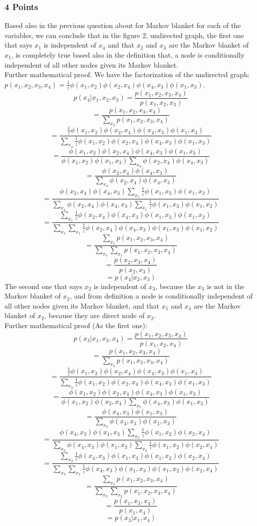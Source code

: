 \subsubsection{4 Points}
Based also in the previous question about for Markov blanket for each of the variables, we can conclude that in the figure 2, undirected graph, the first one that says $x_1$ is independent of $x_4$ and that $x_2$ and $x_3$ are the Markov blanket of $x_1$, is completely true based also in the definition that, a node is conditionally independent of all other nodes given its Markov blanket.\\ 
Further mathematical proof. We have the factorization of the undirected graph: $ p(x_1,x_2,x_3,x_4) = \frac{1}{z}\phi(x_1,x_2)\phi(x_2,x_4)\phi(x_4,x_3)\phi(x_1,x_3)$.
$$ p( x_4 | x_1,x_2,x_3) = \frac{p(x_1,x_2,x_3,x_4)}{p(x_1, x_2,x_3)}$$
$$= \frac{p(x_1,x_2,x_3,x_4)}{\sum_{x_4}p(x_1, x_2,x_3,x_4)}$$
$$= \frac{ \frac{1}{z}\phi(x_1,x_2)\phi(x_2,x_4)\phi(x_4,x_3)\phi(x_1,x_3)}{\sum_{x_4} \frac{1}{z}\phi(x_1,x_2)\phi(x_2,x_4)\phi(x_4,x_3)\phi(x_1,x_3)}$$
$$= \frac{ \phi(x_1,x_2)\phi(x_2,x_4)\phi(x_4,x_3)\phi(x_1,x_3)}{\phi(x_1,x_2)\phi(x_1,x_3) \sum_{x_4} \phi(x_2,x_4)\phi(x_4,x_3)}$$
$$= \frac{ \phi(x_2,x_4)\phi(x_4,x_3)}{\sum_{x_4} \phi(x_2,x_4)\phi(x_4,x_3)}$$
$$= \frac{ \phi(x_2,x_4)\phi(x_4,x_3)\sum_{x_1} \frac{1}{z} \phi(x_1,x_3)\phi(x_1,x_2)}{\sum_{x_4} \phi(x_2,x_4)\phi(x_4,x_3)\sum_{x_1} \frac{1}{z} \phi(x_1,x_3)\phi(x_1,x_2)}$$
$$= \frac{\sum_{x_1} \frac{1}{z} \phi(x_2,x_4)\phi(x_4,x_3) \phi(x_1,x_3)\phi(x_1,x_2)}{\sum_{x_4} \sum_{x_1} \frac{1}{z}\phi(x_2,x_4)\phi(x_4,x_3) \phi(x_1,x_3)\phi(x_1,x_2)}$$
$$= \frac{\sum_{x_1} p(x_1,x_2,x_3,x_4) }{\sum_{x_4} \sum_{x_1} p(x_1,x_2,x_3,x_4) }$$
$$= \frac{p(x_2,x_3,x_4) }{p(x_2,x_3) }$$
$$= p(x_4 |x_2, x_3)$$
 The second one that says $x_2$ is independent of $x_3$, because the $x_3$ is not in the Markov blanket of $x_2$, and from definition a node is conditionally independent of all other nodes given its Markov blanket, and that $x_1$ and $x_4$ are the Markov blanket of $x_2$, because they are direct node of $x_2$.\\
Further mathematical proof (As the first one):\\
 $$ p( x_3 | x_1,x_2,x_4) = \frac{p(x_1,x_2,x_3,x_4)}{p(x_1, x_2,x_4)}$$
$$= \frac{p(x_1,x_2,x_3,x_4)}{\sum_{x_3}p(x_1, x_2,x_3,x_4)}$$
$$= \frac{ \frac{1}{z}\phi(x_1,x_2)\phi(x_2,x_4)\phi(x_4,x_3)\phi(x_1,x_3)}{\sum_{x_3} \frac{1}{z}\phi(x_1,x_2)\phi(x_2,x_4)\phi(x_4,x_3)\phi(x_1,x_3)}$$
$$= \frac{ \phi(x_1,x_2)\phi(x_2,x_4)\phi(x_4,x_3)\phi(x_1,x_3)}{\phi(x_1,x_2)\phi(x_2,x_4) \sum_{x_3} \phi(x_4,x_3)\phi(x_1,x_3)}$$
$$= \frac{\phi(x_4,x_3)\phi(x_1,x_3)}{\sum_{x_3} \phi(x_4,x_3)\phi(x_1,x_3)}$$
$$= \frac{\phi(x_4,x_3)\phi(x_1,x_3)\sum_{x_2} \frac{1}{z} \phi(x_1,x_2)\phi(x_2,x_4)}{\sum_{x_3} \phi(x_4,x_3)\phi(x_1,x_3)\sum_{x_2} \frac{1}{z} \phi(x_1,x_2)\phi(x_2,x_4)}$$
$$= \frac{\sum_{x_2} \frac{1}{z} \phi(x_4,x_3)\phi(x_1,x_3) \phi(x_1,x_2)\phi(x_2,x_4)}{\sum_{x_3} \sum_{x_2} \frac{1}{z} \phi(x_4,x_3)\phi(x_1,x_3) \phi(x_1,x_2)\phi(x_2,x_4)}$$
$$= \frac{\sum_{x_2} p(x_1,x_2,x_3,x_4) }{\sum_{x_3} \sum_{x_2} p(x_1,x_2,x_3,x_4) }$$
$$= \frac{p(x_1,x_3,x_4) }{p(x_1,x_4) }$$
$$= p(x_3 |x_1, x_4)$$
 
